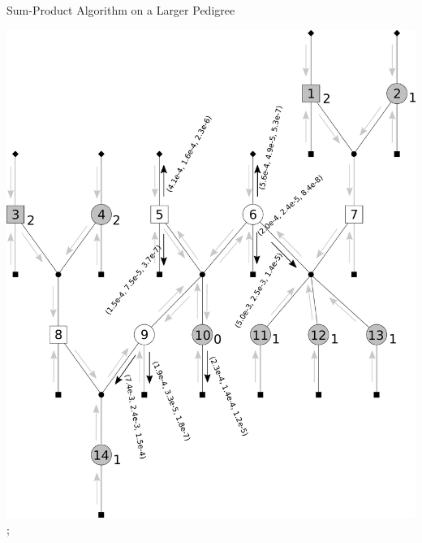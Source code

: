 \documentclass[letter,graphicx]{beamer}
\begin{document}
\begin{frame}{Sum-Product Algorithm on a Larger Pedigree} 
\begin{center} 
\includegraphics[height = 0.8\textheight]{./images/mg-example-step8.pdf}; 
\end{center}
\end{frame}
\end{document}
